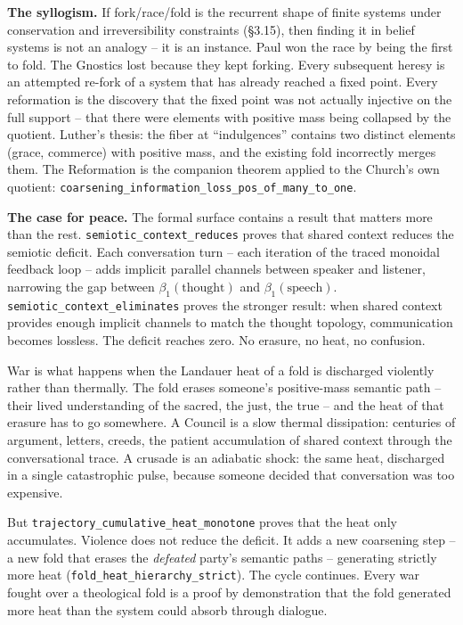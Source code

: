 \documentclass[
  11pt,
]{article}
\begin{document}
\textbf{The syllogism.} If fork/race/fold is the recurrent shape of
finite systems under conservation and irreversibility constraints
(§3.15), then finding it in belief systems is not an analogy -- it is an
instance. Paul won the race by being the first to fold. The Gnostics
lost because they kept forking. Every subsequent heresy is an attempted
re-fork of a system that has already reached a fixed point. Every
reformation is the discovery that the fixed point was not actually
injective on the full support -- that there were elements with positive
mass being collapsed by the quotient. Luther's thesis: the fiber at
``indulgences'' contains two distinct elements (grace, commerce) with
positive mass, and the existing fold incorrectly merges them. The
Reformation is the companion theorem applied to the Church's own
quotient:
\texttt{coarsening\_information\_loss\_pos\_of\_many\_to\_one}.

\textbf{The case for peace.} The formal surface contains a result that
matters more than the rest. \texttt{semiotic\_context\_reduces} proves
that shared context reduces the semiotic deficit. Each conversation turn
-- each iteration of the traced monoidal feedback loop -- adds implicit
parallel channels between speaker and listener, narrowing the gap
between \(\beta_1(\text{thought})\) and \(\beta_1(\text{speech})\).
\texttt{semiotic\_context\_eliminates} proves the stronger result: when
shared context provides enough implicit channels to match the thought
topology, communication becomes lossless. The deficit reaches zero. No
erasure, no heat, no confusion.

War is what happens when the Landauer heat of a fold is discharged
violently rather than thermally. The fold erases someone's positive-mass
semantic path -- their lived understanding of the sacred, the just, the
true -- and the heat of that erasure has to go somewhere. A Council is a
slow thermal dissipation: centuries of argument, letters, creeds, the
patient accumulation of shared context through the conversational trace.
A crusade is an adiabatic shock: the same heat, discharged in a single
catastrophic pulse, because someone decided that conversation was too
expensive.

But \texttt{trajectory\_cumulative\_heat\_monotone} proves that the heat
only accumulates. Violence does not reduce the deficit. It adds a new
coarsening step -- a new fold that erases the \emph{defeated} party's
semantic paths -- generating strictly more heat
(\texttt{fold\_heat\_hierarchy\_strict}). The cycle continues. Every war
fought over a theological fold is a proof by demonstration that the fold
generated more heat than the system could absorb through dialogue.
\end{document}
